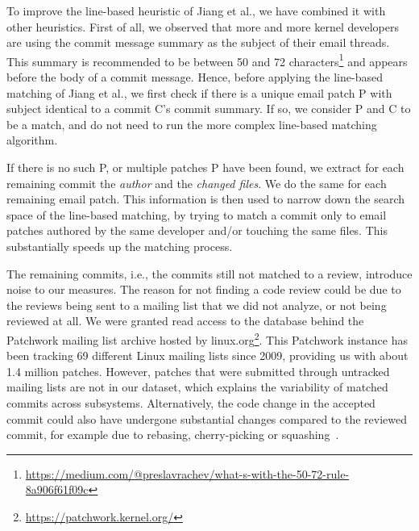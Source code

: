 To improve %
the line-based heuristic of Jiang et al., we have combined it with other heuristics. First of all, we observed that more and more kernel developers are using the commit message summary as the subject of their email threads. %
This summary is recommended to be between 50 and 72 characters\footnote{\url{https://medium.com/@preslavrachev/what-s-with-the-50-72-rule-8a906f61f09c}} and appears before the body of a commit message. Hence, before applying the line-based matching of Jiang et al., we first check if there is a unique email patch P with subject identical to a commit C's commit summary. If so, we consider P and C to be a match, and do not need to run the more complex line-based matching algorithm.

If there is no such P, or multiple patches P have been found, %
we extract for each remaining commit the \textit{author} and the \textit{changed files}. We do the same for each remaining email patch. This information is then used to narrow down the search space of the line-based matching, by trying to match a commit only to email patches authored by the same developer and/or touching the same files. This substantially speeds up the matching process.%

The remaining commits, i.e., the commits still not matched to a review, introduce noise to our measures. The reason for not finding a code review could be due to the reviews being sent to a mailing list that we did not analyze, or not being reviewed at all. We were granted read access to the database behind the Patchwork mailing list archive hosted by linux.org\footnote{\url{https://patchwork.kernel.org/}}. This Patchwork instance has been tracking 69 different Linux mailing lists since 2009, providing us with about 1.4 million patches. However, patches that were submitted through untracked mailing lists are not in our dataset, which explains the variability of matched commits across subsystems. Alternatively, the code change in the accepted commit could also have undergone substantial changes compared to the reviewed commit, for example due to rebasing, cherry-picking or squashing~\citep{Bird-2009}.

